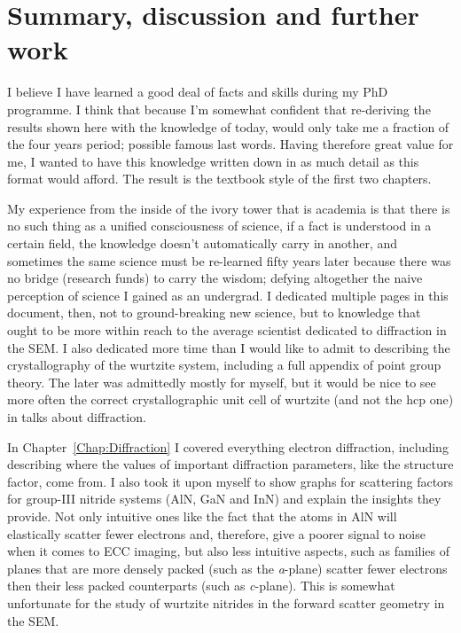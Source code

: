 \chapter{Summary, discussion and further work}
\label{chap:Conclusion}


I believe I have learned a good deal of facts and skills during my PhD programme. I think that because I'm somewhat confident that re-deriving the results shown here with the knowledge of today, would only take me a fraction of the four years period; possible famous last words. Having therefore great value for me, I wanted to have this knowledge written down in as much detail as this format would afford. The result is the textbook style of the first two chapters. 

My experience from the inside of the ivory tower that is academia is that there is no such thing as a unified consciousness of science, if a fact is understood in a certain field, the knowledge doesn't automatically carry in another, and sometimes the same science must be re-learned fifty years later because there was no bridge (research funds) to carry the wisdom; defying altogether the naive perception of science I gained as an undergrad. I dedicated multiple pages in this document, then, not to ground-breaking new science, but to knowledge that ought to be more within reach to the average scientist dedicated to diffraction in the SEM. I also dedicated more time than I would like to admit to describing the crystallography of the wurtzite system, including a full appendix of point group theory. The later was admittedly mostly for myself, but it would be nice to see more often the correct crystallographic unit cell of wurtzite (and not the hcp one) in talks about diffraction. 

In Chapter~\ref{Chap:Diffraction} I covered  everything electron diffraction, including describing where the values of important diffraction parameters, like the structure factor, come from.  I also took it upon myself to show graphs for scattering factors for group-III nitride systems (AlN, GaN and InN) and explain the insights they provide. Not only intuitive ones like the fact that the atoms in AlN will elastically scatter fewer electrons and, therefore, give a poorer signal to noise when it comes to ECC imaging, but also less intuitive aspects, such as families of planes that are more densely packed (such as the \textit{a}-plane) scatter fewer electrons then their less packed counterparts (such as \textit{c}-plane). This is somewhat unfortunate for the study of \hkl[001] wurtzite nitrides in the forward scatter geometry in the SEM. 

